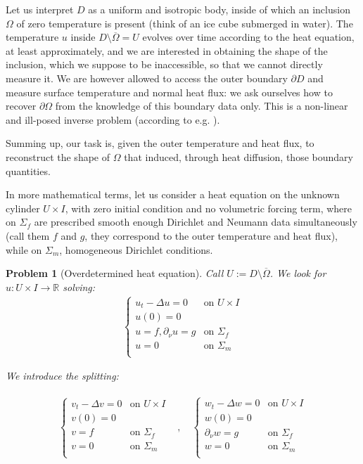 \documentclass[english,a4paper,9pt,oneside]{scrbook}	%
\theoremstyle{break}
\newtheorem{pb}[equation]{Problem}
\theoremstyle{remark}
\newcommand{\mR}{\mathbb{R}}
\begin{document}
Let us interpret $D$ as a uniform and isotropic body, inside of which an inclusion $\Omega$ of zero temperature is present (think of an ice cube submerged in water). The temperature $u$ inside $D\setminus \overline{\Omega} = U$ evolves over time according to the heat equation, at least approximately, and we are interested in obtaining the shape of the inclusion, which we suppose to be inaccessible, so that we cannot directly measure it. We are however allowed to access the outer boundary $\partial D$ and measure surface temperature and normal heat flux: we ask ourselves how to recover $\partial \Omega$ from the knowledge of this boundary data only. This is a non-linear and ill-posed inverse problem (according to e.g. \cite{harbrecht}). 

Summing up, our task is, given the outer temperature and heat flux, to reconstruct the shape of $\Omega$ that induced, through heat diffusion, those boundary quantities.

In more mathematical terms, let us consider a heat equation on the unknown cylinder $U\times I$, with zero initial condition and no volumetric forcing term, where on $\Sigma_f$ are prescribed smooth enough Dirichlet and Neumann data simultaneously (call them $f$ and $g$, they correspond to the outer temperature and heat flux), while on $\Sigma_m$, homogeneous Dirichlet conditions.

\begin{pb}[Overdetermined heat equation]
\label{pb:pdes}
Call $U:=D\setminus \overline{\Omega}$. We look for $u:U \times I \rightarrow \mR$ solving:
\begin{align*}
\left\{\begin{matrix}
u_t -\Delta u=0 & \text{on }U\times I \\ 
u(0)=0 & \\ 
u = f, \partial_\nu u=g & \text{on }\Sigma_f\\
u = 0 & \text{on }\Sigma_m\\
\end{matrix}\right.
\end{align*}

We introduce the splitting:

\begin{align*}
\begin{matrix}
\left\{\begin{matrix}
v_t -\Delta v=0 & \text{on }U\times I \\ 
v(0)=0 & \\ 
v = f& \text{on }\Sigma_f\\
v = 0 & \text{on }\Sigma_m\\
\end{matrix}\right. &, \quad  \left\{\begin{matrix}
w_t -\Delta w=0 & \text{on }U\times I \\ 
w(0)=0 & \\ 
\partial_\nu w=g & \text{on }\Sigma_f\\
w = 0 & \text{on }\Sigma_m\\
\end{matrix}\right.
\end{matrix}
\end{align*}
\end{pb}
\end{document}
